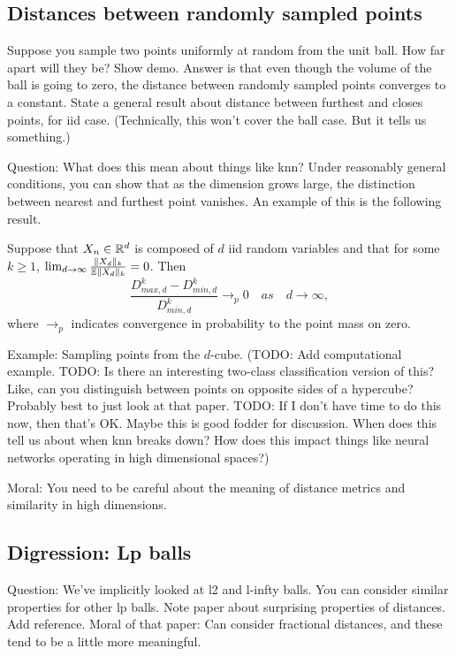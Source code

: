 \subsection{Distances between randomly sampled points}
Suppose you sample two points uniformly at random from the unit ball. How far apart will they be? Show demo. Answer is that even though the volume of the ball is going to zero, the distance between randomly sampled points converges to a constant. State a general result about distance between furthest and closes points, for iid case. (Technically, this won't cover the ball case. But it tells us something.) 

Question: What does this mean about things like knn? Under reasonably general conditions, you can show that as the dimension grows large, the distinction between nearest and furthest point vanishes. An example of this is the following result. 
\begin{theorem}
Suppose that $X_n\in \mathbb{R}^d$ is composed of $d$ iid random variables and that for some $k\geq 1$, $\lim_{d\to\infty} \frac{\|X_d\|_k}{\mathbb{E} \|X_d\|_k} = 0$. Then 
$$
\frac{D_{max, d}^k - D_{min, d}^k}{D_{min, d}^k} \to_{p} 0 \quad as \quad d\to \infty,
$$
where $\to_p$ indicates convergence in probability to the point mass on zero. 
\end{theorem}

Example: Sampling points from the $d$-cube. (TODO: Add computational example. TODO: Is there an interesting two-class classification version of this? Like, can you distinguish between points on opposite sides of a hypercube? Probably best to just look at that paper. TODO: If I don't have time to do this now, then that's OK. Maybe this is good fodder for discussion. When does this tell us about when knn breaks down? How does this impact things like neural networks operating in high dimensional spaces?)  

Moral: You need to be careful about the meaning of distance metrics and similarity in high dimensions. 

\subsection{Digression: Lp balls}
Question: We've implicitly looked at l2 and l-infty balls. You can consider similar properties for other lp balls. Note paper about surprising properties of distances. Add reference. Moral of that paper: Can consider fractional distances, and these tend to be a little more meaningful. 

